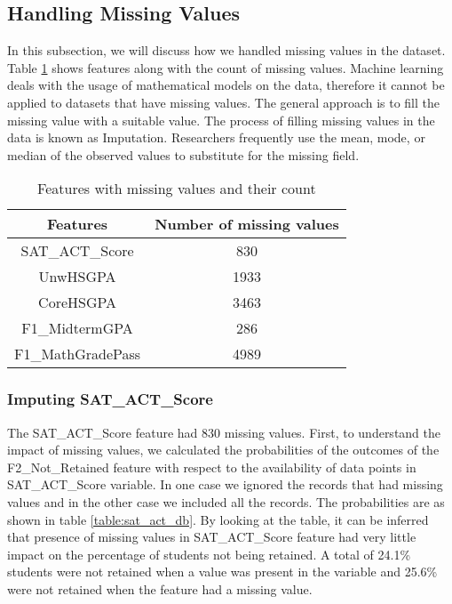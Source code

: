 \documentclass[11pt,openright]{report}
\begin{document}
\subsection {Handling Missing Values}
In this subsection, we will discuss how we handled missing values in the dataset. Table \ref{table:missing_db} shows features along with the count of missing values. Machine learning deals with the usage of mathematical models on the data, therefore it cannot be applied to datasets that have missing values. The general approach is to fill the missing value with a suitable value. The process of filling missing values in the data is known as Imputation. Researchers frequently use the mean, mode, or median of the observed values to substitute for the missing field.
 \begin{table}[!htb]
	\renewcommand{\arraystretch}{1.3}
	\caption{Features with missing values and their count}
	\label{table:missing_db}
	\centering
	\begin{tabular}{|c|c|}
		\hline
		\bfseries Features & \bfseries Number of missing values \\
		\hline
		SAT\_ACT\_Score & 830\\ \hline
		UnwHSGPA & 1933\\ \hline
		CoreHSGPA & 3463\\ \hline
		F1\_MidtermGPA & 286\\ \hline
		F1\_MathGradePass & 4989\\ \hline
	\end{tabular}
\end{table}

\subsubsection {Imputing SAT\_ACT\_Score}
The SAT\_ACT\_Score feature had 830 missing values. First, to understand the impact of missing values, we calculated the probabilities of the outcomes of  the F2\_Not\_Retained feature with respect to the availability of data points in SAT\_ACT\_Score variable. In one case we ignored the records that had missing values and in the other case we included all the records. The probabilities are as shown in table \ref{table:sat_act_db}. By looking at the table, it can be inferred that presence of missing values in SAT\_ACT\_Score feature had very little impact on the percentage of students not being retained. A total of 24.1\% students were not retained when a value was present in the variable and 25.6\% were not retained when the feature had a missing value.
\end{document}
